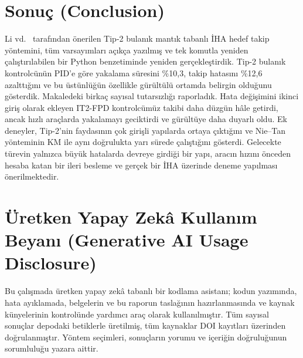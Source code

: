 \documentclass[conference,a4paper]{IEEEtran}
\begin{document}
\section{Sonuç (Conclusion)}
Li vd.~\cite{li2024} tarafından önerilen Tip-2 bulanık mantık tabanlı İHA hedef takip yöntemini, tüm varsayımları açıkça yazılmış ve tek komutla yeniden çalıştırılabilen bir Python benzetiminde yeniden gerçekleştirdik. Tip-2 bulanık kontrolcünün PID'e göre yakalama süresini \%10,3, takip hatasını \%12,6 azalttığını ve bu üstünlüğün özellikle gürültülü ortamda belirgin olduğunu gösterdik. Makaledeki birkaç sayısal tutarsızlığı raporladık. Hata değişimini ikinci giriş olarak ekleyen IT2-FPD kontrolcümüz takibi daha düzgün hâle getirdi, ancak hızlı araçlarda yakalamayı geciktirdi ve gürültüye daha duyarlı oldu. Ek deneyler, Tip-2'nin faydasının çok girişli yapılarda ortaya çıktığını ve Nie--Tan yönteminin KM ile aynı doğrulukta yarı sürede çalıştığını gösterdi. Gelecekte türevin yalnızca büyük hatalarda devreye girdiği bir yapı, aracın hızını önceden hesaba katan bir ileri besleme ve gerçek bir İHA üzerinde deneme yapılması önerilmektedir.

\section*{Üretken Yapay Zekâ Kullanım Beyanı (Generative AI Usage Disclosure)}
Bu çalışmada üretken yapay zekâ tabanlı bir kodlama asistanı; kodun yazımında, hata ayıklamada, belgelerin ve bu raporun taslağının hazırlanmasında ve kaynak künyelerinin kontrolünde yardımcı araç olarak kullanılmıştır. Tüm sayısal sonuçlar depodaki betiklerle üretilmiş, tüm kaynaklar DOI kayıtları üzerinden doğrulanmıştır. Yöntem seçimleri, sonuçların yorumu ve içeriğin doğruluğunun sorumluluğu yazara aittir.
\end{document}
